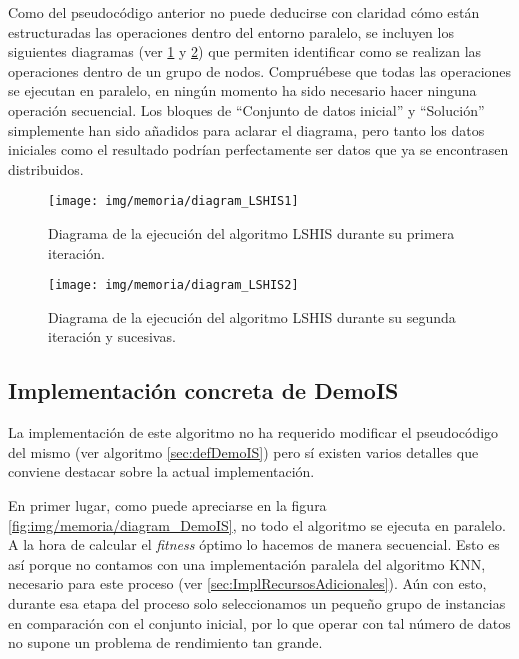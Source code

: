Como del pseudocódigo anterior no puede deducirse con claridad cómo están estructuradas las operaciones dentro del entorno paralelo, se incluyen los siguientes diagramas (ver \ref{fig:img/memoria/diagram_LSHIS1} y \ref{fig:img/memoria/diagram_LSHIS2}) que permiten identificar como se realizan las operaciones dentro de un grupo de nodos. Compruébese que todas las operaciones se ejecutan en paralelo, en ningún momento ha sido necesario hacer ninguna operación secuencial. Los bloques de ``Conjunto de datos inicial'' y ``Solución'' simplemente han sido añadidos para aclarar el diagrama, pero tanto los datos iniciales como el resultado podrían perfectamente ser datos que ya se encontrasen distribuidos.

	\begin{figure}[!h]
		\centering
		\texttt{[image: img/memoria/diagram\_LSHIS1]}
		\caption{Diagrama de la ejecución del algoritmo LSHIS durante su primera iteración.}\label{fig:img/memoria/diagram_LSHIS1}
	\end{figure}
	\FloatBarrier
	
		\begin{figure}[!h]
		\centering
		\texttt{[image: img/memoria/diagram\_LSHIS2]}
		\caption{Diagrama de la ejecución del algoritmo LSHIS durante su segunda iteración y sucesivas.}\label{fig:img/memoria/diagram_LSHIS2}
	\end{figure}
	\FloatBarrier



\subsection{Implementación concreta de DemoIS}

La implementación de este algoritmo no ha requerido modificar el pseudocódigo del mismo (ver algoritmo \ref{sec:defDemoIS}) pero sí existen varios detalles que conviene destacar sobre la actual implementación.

En primer lugar, como puede apreciarse en la figura \ref{fig:img/memoria/diagram_DemoIS}, no todo el algoritmo se ejecuta en paralelo. A la hora de calcular el \textit{fitness} óptimo lo hacemos de manera secuencial. Esto es así porque no contamos con una implementación paralela del algoritmo KNN, necesario para este proceso (ver \ref{sec:ImplRecursosAdicionales}). Aún con esto, durante esa etapa del proceso solo seleccionamos un pequeño grupo de instancias en comparación con el conjunto inicial, por lo que operar con tal número de datos no supone un problema de rendimiento tan grande.

